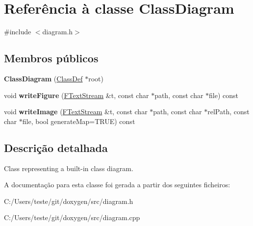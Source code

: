 \hypertarget{class_class_diagram}{\section{Referência à classe Class\-Diagram}
\label{class_class_diagram}
}


{\ttfamily \#include $<$diagram.\-h$>$}

\subsection*{Membros públicos}
\begin{DoxyCompactItemize}
\item 
\hypertarget{class_class_diagram_a7be5f9661b40afb467345b88462d8b03}{{\bfseries Class\-Diagram} (\hyperlink{class_class_def}{Class\-Def} $\ast$root)}\label{class_class_diagram_a7be5f9661b40afb467345b88462d8b03}

\item 
\hypertarget{class_class_diagram_afffd575a20d220c26cfdcf0a092419a0}{void {\bfseries write\-Figure} (\hyperlink{class_f_text_stream}{F\-Text\-Stream} \&t, const char $\ast$path, const char $\ast$file) const }\label{class_class_diagram_afffd575a20d220c26cfdcf0a092419a0}

\item 
\hypertarget{class_class_diagram_a7ce2eebb2c9b5950f6831fd6ebd2daf0}{void {\bfseries write\-Image} (\hyperlink{class_f_text_stream}{F\-Text\-Stream} \&t, const char $\ast$path, const char $\ast$rel\-Path, const char $\ast$file, bool generate\-Map=T\-R\-U\-E) const }\label{class_class_diagram_a7ce2eebb2c9b5950f6831fd6ebd2daf0}

\end{DoxyCompactItemize}


\subsection{Descrição detalhada}
Class representing a built-\/in class diagram. 

A documentação para esta classe foi gerada a partir dos seguintes ficheiros\-:\begin{DoxyCompactItemize}
\item 
C\-:/\-Users/teste/git/doxygen/src/diagram.\-h\item 
C\-:/\-Users/teste/git/doxygen/src/diagram.\-cpp\end{DoxyCompactItemize}
